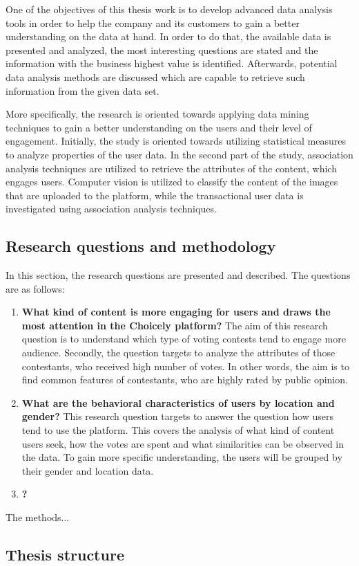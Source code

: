     One of the objectives of this thesis work is to develop advanced data analysis tools in order to help the company and its customers to gain a better understanding on the data at hand. In order to do that, the available data is presented and analyzed, the most interesting questions are stated and the information with the business highest value is identified. Afterwards, potential data analysis methods are discussed which are capable to retrieve such information from the given data set.  

    More specifically, the research is oriented towards applying data mining techniques to gain a better understanding on the users and their level of engagement. Initially, the study is oriented towards utilizing statistical measures to analyze properties of the user data. In the second part of the study, association analysis techniques are utilized to retrieve the attributes of the content, which engages users. Computer vision is utilized to classify the content of the images that are uploaded to the platform, while the transactional user data is investigated using association analysis techniques. %

\subsection{Research questions and methodology}
    In this section, the research questions are presented and described. The questions are as follows:

    \begin{enumerate}[label=RQ\arabic*:]
        \item \textbf{What kind of content is more engaging for users and draws the most attention in the Choicely platform?} The aim of this research question is to understand which type of voting contests tend to engage more audience. Secondly, the question targets to analyze the attributes of those contestants, who received high number of votes. In other words, the aim is to find common features of contestants, who are highly rated by public opinion.     
        \item \textbf{What are the behavioral characteristics of users by location and gender?} This research question targets to answer the question how users tend to use the platform. This covers the analysis of what kind of content users seek, how the votes are spent and what similarities can be observed in the data. To gain more specific understanding, the users will be grouped by their gender and location data.  
        \item \textbf{?}
    \end{enumerate}  

    The methods...

\subsection{Thesis structure}

